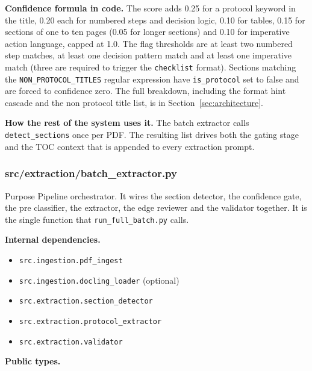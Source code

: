 \documentclass{article}
\begin{document}
\textbf{Confidence formula in code.} The score adds 0.25 for a
protocol keyword in the title, 0.20 each for numbered steps and
decision logic, 0.10 for tables, 0.15 for sections of one to ten
pages (0.05 for longer sections) and 0.10 for imperative action
language, capped at 1.0. The flag thresholds are at least two
numbered step matches, at least one decision pattern match and at
least one imperative match (three are required to trigger the
\texttt{checklist} format). Sections matching the
\texttt{NON\_PROTOCOL\_TITLES} regular expression have
\texttt{is\_protocol} set to false and are forced to confidence
zero. The full breakdown, including the format hint cascade and the
non protocol title list, is in
Section~\ref{sec:architecture}.

\textbf{How the rest of the system uses it.} The batch extractor calls
\texttt{detect\_sections} once per PDF. The resulting list drives both
the gating stage and the TOC context that is appended to every
extraction prompt.

\subsubsection{src/extraction/batch\_extractor.py}

\begin{codeconceptbox}{Purpose}
Pipeline orchestrator. It wires the section detector, the confidence
gate, the pre classifier, the extractor, the edge reviewer and the
validator together. It is the single function that
\texttt{run\_full\_batch.py} calls.
\end{codeconceptbox}

\textbf{Internal dependencies.}
\begin{itemize}[leftmargin=2em, nosep, label={--}]
\item \texttt{src.ingestion.pdf\_ingest}
\item \texttt{src.ingestion.docling\_loader} (optional)
\item \texttt{src.extraction.section\_detector}
\item \texttt{src.extraction.protocol\_extractor}
\item \texttt{src.extraction.validator}
\end{itemize}

\textbf{Public types.}
\end{document}
